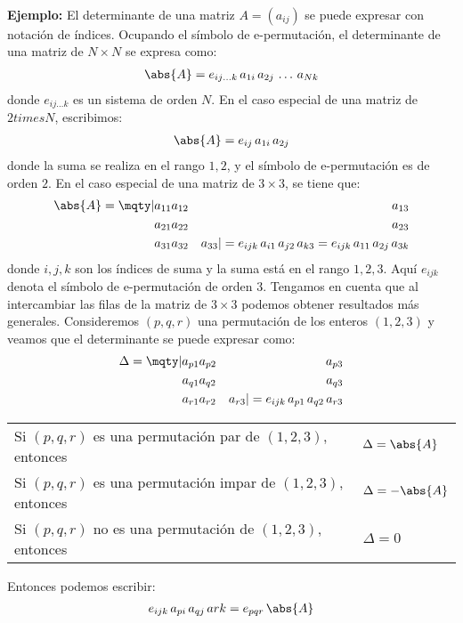 \\[0.5em]
\noindent
\textbf{Ejemplo: } El determinante de una matriz $A = (a_{ij})$ se puede expresar con notación de índices. Ocupando el símbolo de e-permutación, el determinante de una matriz de $N \times N$ se expresa como:
\begin{align*}
\abs{A} = e_{ij \ldots k} \, a_{1i} \, a_{2j} \, \ldots \, a_{Nk} 
\end{align*}
donde $e_{ij \ldots k}$ es un sistema de orden $N$. En el caso especial de una matriz de $2 times N$, escribimos:
\begin{align*}
\abs{A} = e_{ij} \, a_{1i} \, a_{2j}
\end{align*}
donde la suma se realiza en el rango $1, 2$, y el símbolo de e-permutación es de orden $2$. En el caso especial de una matriz de $3 \times 3$, se tiene que:
\begin{align*}
\abs{A} = \mqty|
a_{11} & a_{12} & a_{13} \\
a_{21} & a_{22} & a_{23} \\
a_{31} & a_{32} & a_{33}
| = e_{ijk} \, a_{i1} \, a_{j2} \, a_{k3} = e_{ijk} \, a_{11} \, a_{2j} \, a_{3k}
\end{align*}
donde $i, j, k$ son los índices de suma y la suma está en el rango $1, 2, 3$. Aquí $e_{ijk}$ denota el símbolo de e-permutación de orden $3$. Tengamos en cuenta que al intercambiar las filas de la matriz de $3 \times 3$ podemos obtener resultados más generales. Consideremos $(p,q, r)$ una permutación de los enteros $(1, 2, 3)$ y veamos que el determinante se puede expresar como:
\begin{align*}
\Delta = \mqty|
a_{p1} & a_{p2} & a_{p3} \\
a_{q1} & a_{q2} & a_{q3} \\
a_{r1} & a_{r2} & a_{r3}
| = e_{ijk} \, a_{p1} \, a_{q2} \, a_{r3}
\end{align*}
\begin{table}[H]
\large
\centering
\begin{tabular}{l l}
Si $(p, q, r)$ es una permutación par de $(1, 2, 3)$, entonces & $\Delta = \abs{A}$ \\
Si $(p, q, r)$ es una permutación impar de $(1, 2, 3)$, entonces & $\Delta = -\abs{A}$ \\
Si $(p, q, r)$ no es una permutación de $(1, 2, 3)$, entonces & $\Delta = 0$    
\end{tabular}
\end{table}
Entonces podemos escribir:
\begin{align*}
e_{ijk} \, a_{pi} \, a_{qj} \, a{rk} = e_{pqr} \, \abs{A}
\end{align*}

